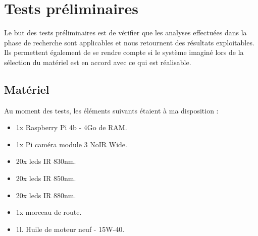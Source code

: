 \section{Tests préliminaires \label{test_vision}}
Le but des tests préliminaires est de vérifier que les analyses effectuées dans la phase de recherche sont applicables et nous retournent
des résultats exploitables. Ils permettent également de se rendre compte si le système imaginé lors de la sélection du matériel est en accord avec
ce qui est réalisable.
\subsection{Matériel}
Au moment des tests, les éléments suivants étaient à ma disposition :
\begin{itemize}
    \item 1x Raspberry Pi 4b - 4Go de RAM.
    \item 1x Pi caméra module 3 NoIR Wide.
    \item 20x leds IR 830nm.
    \item 20x leds IR 850nm.
    \item 20x leds IR 880nm.
    \item 1x morceau de route.
    \item 1l. Huile de moteur neuf - 15W-40.
\end{itemize}

